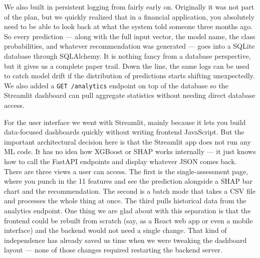 We also built in persistent logging from fairly early on. Originally it was not part of the plan, but we quickly realized that in a financial application, you absolutely need to be able to look back at what the system told someone three months ago. So every prediction --- along with the full input vector, the model name, the class probabilities, and whatever recommendation was generated --- goes into a SQLite database through SQLAlchemy. It is nothing fancy from a database perspective, but it gives us a complete paper trail. Down the line, the same logs can be used to catch model drift if the distribution of predictions starts shifting unexpectedly. We also added a \texttt{GET /analytics} endpoint on top of the database so the Streamlit dashboard can pull aggregate statistics without needing direct database access.

For the user interface we went with Streamlit, mainly because it lets you build data-focused dashboards quickly without writing frontend JavaScript. But the important architectural decision here is that the Streamlit app does not run any ML code. It has no idea how XGBoost or SHAP works internally --- it just knows how to call the FastAPI endpoints and display whatever JSON comes back. There are three views a user can access. The first is the single-assessment page, where you punch in the 11 features and see the prediction alongside a SHAP bar chart and the recommendation. The second is a batch mode that takes a CSV file and processes the whole thing at once. The third pulls historical data from the analytics endpoint. One thing we are glad about with this separation is that the frontend could be rebuilt from scratch (say, as a React web app or even a mobile interface) and the backend would not need a single change. That kind of independence has already saved us time when we were tweaking the dashboard layout --- none of those changes required restarting the backend server.
